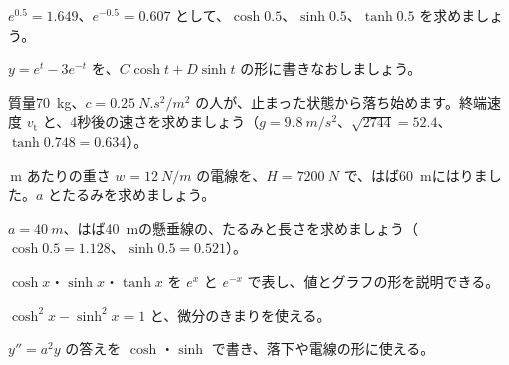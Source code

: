 \bkproblem $e^{0.5}=1.649$、$e^{-0.5}=0.607$ として、$\cosh0.5$、$\sinh0.5$、$\tanh0.5$ を求めましょう。


\bkproblem $y=e^{t}-3e^{-t}$ を、$C\cosh t+D\sinh t$ の形に書きなおしましょう。

\bkproblem 質量\qty{70}{kg}、$c=\qty{0.25}{N.s^2/m^2}$ の人が、止まった状態から落ち始めます。終端速度 $v_{\mathrm t}$ と、4秒後の速さを求めましょう（$g=\qty{9.8}{m/s^2}$、$\sqrt{2744}=52.4$、$\tanh0.748=0.634$）。

\,m あたりの重さ $w=\qty{12}{N/m}$ の電線を、$H=\qty{7200}{N}$ で、はば\qty{60}{m}にはりました。$a$ とたるみを求めましょう。

\bkproblem $a=\qty{40}{m}$、はば\qty{40}{m}の懸垂線の、たるみと長さを求めましょう（$\cosh0.5=1.128$、$\sinh0.5=0.521$）。

\begin{furikaeri}
\begin{checklist}
\item $\cosh x$・$\sinh x$・$\tanh x$ を $e^x$ と $e^{-x}$ で表し、値とグラフの形を説明できる。
\item $\cosh^2x-\sinh^2x=1$ と、微分のきまりを使える。
\item $y''=a^2y$ の答えを $\cosh$・$\sinh$ で書き、落下や電線の形に使える。
\end{checklist}
\end{furikaeri}


